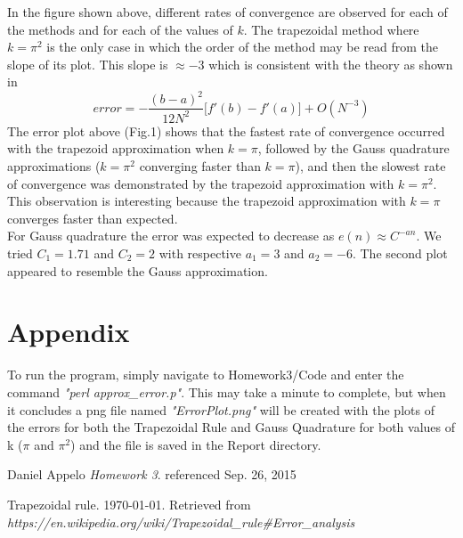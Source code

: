 \documentclass[12pt]{article}
\theoremstyle{definition}
\theoremstyle{definition}
\begin{document}
In the figure shown above, different rates of convergence are observed for each of the methods and for each of the values of \(k\). The trapezoidal method where \(k=\pi^{2}\) is the only case in which the order of the method may be read from the slope of its plot. This slope is \(\approx -3\) which is consistent with the theory as shown in \cite{Wiki}
\[
error=-\frac{(b-a)^{2}}{12N^{2}}\big[f\prime(b)-f\prime(a)\big]+\textit{O}(N^{-3})
\]
The error plot above (Fig.1) shows that the fastest rate of convergence occurred with the trapezoid approximation when \(k=\pi\), followed by the Gauss quadrature approximations (\(k=\pi^{2}\) converging faster than \(k=\pi\)), and then the slowest rate of convergence was demonstrated by the trapezoid approximation with \(k=\pi^{2}\). This observation is interesting because the trapezoid approximation with \(k=\pi\) converges faster than expected.
\\ 
For Gauss quadrature the error was expected to decrease as \(e(n)\approx C^{-an}\). We tried \(C_{1} = 1.71\) and \(C_{2} = 2\) with respective \(a_{1} = 3\) and \(a_{2} = -6\). The second plot appeared to resemble the Gauss approximation.

\newpage
\section{Appendix}
To run the program, simply navigate to Homework3/Code and enter the command \textit{"perl approx\_error.p"}. This may take a minute to complete, but when it concludes a png file named \textit{"ErrorPlot.png"} will be created with the plots of the errors for both the Trapezoidal Rule and Gauss Quadrature for both values of k (\(\pi\) and \(\pi^{2}\)) and the file is saved in the Report directory.

\newpage
\begin{thebibliography}{9}
Daniel Appelo
\textit{Homework 3}. 
referenced Sep. 26, 2015

Trapezoidal rule. \today. Retrieved from\\
\textit{https://en.wikipedia.org/wiki/Trapezoidal\_rule\#Error\_analysis}
\end{thebibliography}
\end{document}
